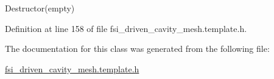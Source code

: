 Destructor(empty) 



Definition at line 158 of file fsi\+\_\+driven\+\_\+cavity\+\_\+mesh.\+template.\+h.



The documentation for this class was generated from the following file\+:\begin{DoxyCompactItemize}
\item 
\hyperlink{fsi__driven__cavity__mesh_8template_8h}{fsi\+\_\+driven\+\_\+cavity\+\_\+mesh.\+template.\+h}\end{DoxyCompactItemize}
